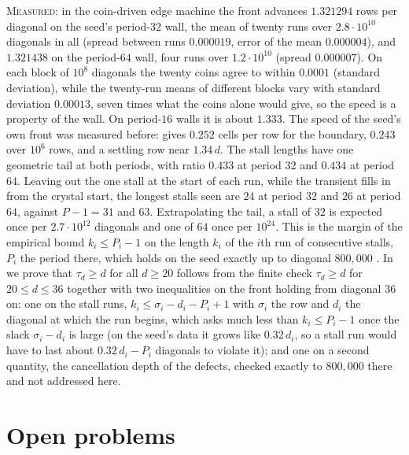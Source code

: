 \documentclass[11pt]{article}
\theoremstyle{definition}
\theoremstyle{remark}
\newcommand{\MEASURED}{\textsc{Measured}}
\begin{document}
\MEASURED: in the coin-driven edge machine the front advances $1.321294$ rows per diagonal on the seed's period-$32$ wall, the mean of twenty runs over $2.8\cdot10^{10}$ diagonals in all (spread between runs $0.000019$, error of the mean $0.000004$), and $1.321438$ on the period-$64$ wall, four runs over $1.2\cdot10^{10}$ (spread $0.000007$). On each block of $10^8$ diagonals the twenty coins agree to within $0.0001$ (standard deviation), while the twenty-run means of different blocks vary with standard deviation $0.00013$, seven times what the coins alone would give, so the speed is a property of the wall. On period-$16$ walls it is about $1.333$. The speed of the seed's own front was measured before: \cite[p.~871]{NKS} gives $0.252$ cells per row for the boundary, \cite{Dib2} $0.243$ over $10^6$ rows, and \cite{Pat2} a settling row near $1.34\,d$. The stall lengths have one geometric tail at both periods, with ratio $0.433$ at period $32$ and $0.434$ at period $64$. Leaving out the one stall at the start of each run, while the transient fills in from the crystal start, the longest stalls seen are $24$ at period $32$ and $26$ at period $64$, against $P-1=31$ and $63$. Extrapolating the tail, a stall of $32$ is expected once per $2.7\cdot10^{12}$ diagonals and one of $64$ once per $10^{24}$. This is the margin of the empirical bound $k_i\le P_i-1$ on the length $k_i$ of the $i$th run of consecutive stalls, $P_i$ the period there, which holds on the seed exactly up to diagonal $800{,}000$ \cite{B}. In \cite{B} we prove that $\tau_d\ge d$ for all $d\ge20$ follows from the finite check $\tau_d\ge d$ for $20\le d\le36$ together with two inequalities on the front holding from diagonal $36$ on: one on the stall runs, $k_i\le\sigma_i-d_i-P_i+1$ with $\sigma_i$ the row and $d_i$ the diagonal at which the run begins, which asks much less than $k_i\le P_i-1$ once the slack $\sigma_i-d_i$ is large (on the seed's data it grows like $0.32\,d_i$, so a stall run would have to last about $0.32\,d_i-P_i$ diagonals to violate it); and one on a second quantity, the cancellation depth of the defects, checked exactly to $800{,}000$ there and not addressed here.

\section{Open problems}
\end{document}
